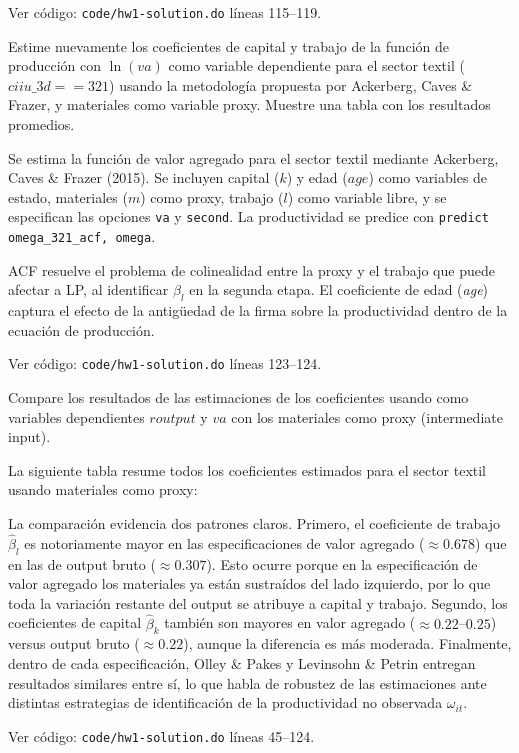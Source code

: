 \documentclass[answers]{exam}
\begin{document}
\begin{questions}
\begin{solution}
Ver código: \texttt{code/hw1-solution.do} líneas 115--119.
\end{solution}

\question Estime nuevamente los coeficientes de capital y trabajo de la función de producción con $\ln(va)$ como variable dependiente para el sector textil ($\mathit{ciiu\_3d} == 321$) usando la metodología propuesta por Ackerberg, Caves \& Frazer, y materiales como variable proxy. Muestre una tabla con los resultados promedios.

\begin{solution}
Se estima la función de valor agregado para el sector textil mediante Ackerberg, Caves \& Frazer (2015). Se incluyen capital ($k$) y edad ($age$) como variables de estado, materiales ($m$) como proxy, trabajo ($l$) como variable libre, y se especifican las opciones \texttt{va} y \texttt{second}. La productividad se predice con \texttt{predict omega\_321\_acf, omega}.



ACF resuelve el problema de colinealidad entre la proxy y el trabajo que puede afectar a LP, al identificar $\beta_l$ en la segunda etapa. El coeficiente de edad (\textit{age}) captura el efecto de la antigüedad de la firma sobre la productividad dentro de la ecuación de producción.

Ver código: \texttt{code/hw1-solution.do} líneas 123--124.
\end{solution}

\question Compare los resultados de las estimaciones de los coeficientes usando como variables dependientes $\mathit{routput}$ y $va$ con los materiales como proxy (intermediate input).

\begin{solution}
La siguiente tabla resume todos los coeficientes estimados para el sector textil usando materiales como proxy:



La comparación evidencia dos patrones claros. Primero, el coeficiente de trabajo $\hat{\beta}_l$ es notoriamente mayor en las especificaciones de valor agregado ($\approx 0.678$) que en las de output bruto ($\approx 0.307$). Esto ocurre porque en la especificación de valor agregado los materiales ya están sustraídos del lado izquierdo, por lo que toda la variación restante del output se atribuye a capital y trabajo. Segundo, los coeficientes de capital $\hat{\beta}_k$ también son mayores en valor agregado ($\approx 0.22$--$0.25$) versus output bruto ($\approx 0.22$), aunque la diferencia es más moderada. Finalmente, dentro de cada especificación, Olley \& Pakes y Levinsohn \& Petrin entregan resultados similares entre sí, lo que habla de robustez de las estimaciones ante distintas estrategias de identificación de la productividad no observada $\omega_{it}$.

Ver código: \texttt{code/hw1-solution.do} líneas 45--124.
\end{solution}

\end{questions}
\end{document}

